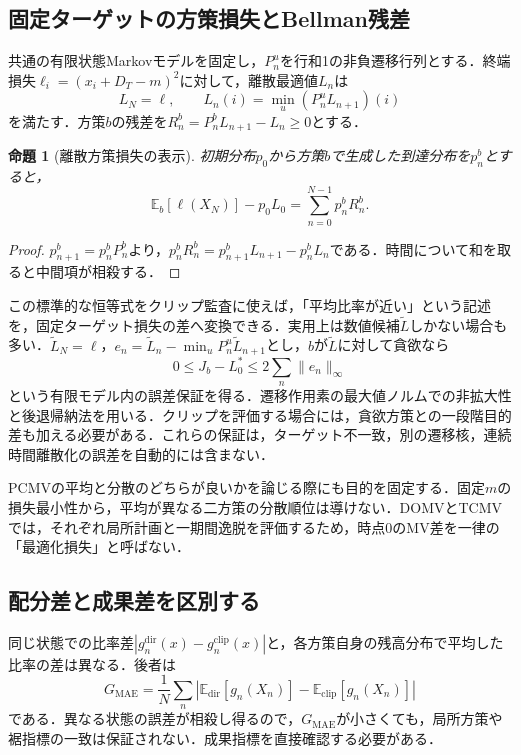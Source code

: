 \documentclass[11pt,a4paper]{article}
\numberwithin{equation}{section}
\numberwithin{table}{section}
\numberwithin{figure}{section}
\theoremstyle{plain}
\newtheorem{proposition}{命題}
\theoremstyle{definition}
\newcommand{\E}{\mathbb{E}}
\begin{document}
\subsection{固定ターゲットの方策損失とBellman残差}
共通の有限状態Markovモデルを固定し，$P_n^u$を行和1の非負遷移行列とする．終端損失$\ell_i=(x_i+D_T-m)^2$に対して，離散最適値$L_n$は
\begin{equation}
L_N=\ell,\qquad L_n(i)=\min_u(P_n^uL_{n+1})(i)
\label{eq:discreteBellman}
\end{equation}
を満たす．方策$b$の残差を$R_n^b=P_n^bL_{n+1}-L_n\geq0$とする．
\begin{proposition}[離散方策損失の表示]
初期分布$p_0$から方策$b$で生成した到達分布を$p_n^b$とすると，
\begin{equation}
\E_b[\ell(X_N)]-p_0L_0=\sum_{n=0}^{N-1}p_n^b R_n^b.
\label{eq:bellmangap}
\end{equation}
\end{proposition}
\begin{proof}
$p_{n+1}^b=p_n^bP_n^b$より，$p_n^bR_n^b=p_{n+1}^bL_{n+1}-p_n^bL_n$である．時間について和を取ると中間項が相殺する．
\end{proof}
この標準的な恒等式をクリップ監査に使えば，「平均比率が近い」という記述を，固定ターゲット損失の差へ変換できる．実用上は数値候補$\widetilde L$しかない場合も多い．$\widetilde L_N=\ell$，$e_n=\widetilde L_n-\min_uP_n^u\widetilde L_{n+1}$とし，$b$が$\widetilde L$に対して貪欲なら
\begin{equation}
0\leq J_b-L_0^*\leq2\sum_n\|e_n\|_\infty
\label{eq:resbound}
\end{equation}
という有限モデル内の誤差保証を得る．遷移作用素の最大値ノルムでの非拡大性と後退帰納法を用いる．クリップを評価する場合には，貪欲方策との一段階目的差も加える必要がある．これらの保証は，ターゲット不一致，別の遷移核，連続時間離散化の誤差を自動的には含まない．

PCMVの平均と分散のどちらが良いかを論じる際にも目的を固定する．固定$m$の損失最小性から，平均が異なる二方策の分散順位は導けない．DOMVとTCMVでは，それぞれ局所計画と一期間逸脱を評価するため，時点0のMV差を一律の「最適化損失」と呼ばない．

\subsection{配分差と成果差を区別する}
同じ状態での比率差$|g^{\mathrm{dir}}_n(x)-g^{\mathrm{clip}}_n(x)|$と，各方策自身の残高分布で平均した比率の差は異なる．後者は
\begin{equation}
G_{\mathrm{MAE}}=\frac1N\sum_n\left|\E_{\mathrm{dir}}[g_n(X_n)]-
\E_{\mathrm{clip}}[g_n(X_n)]\right|
\label{eq:gmae}
\end{equation}
である．異なる状態の誤差が相殺し得るので，$G_{\mathrm{MAE}}$が小さくても，局所方策や裾指標の一致は保証されない．成果指標を直接確認する必要がある．
\end{document}
